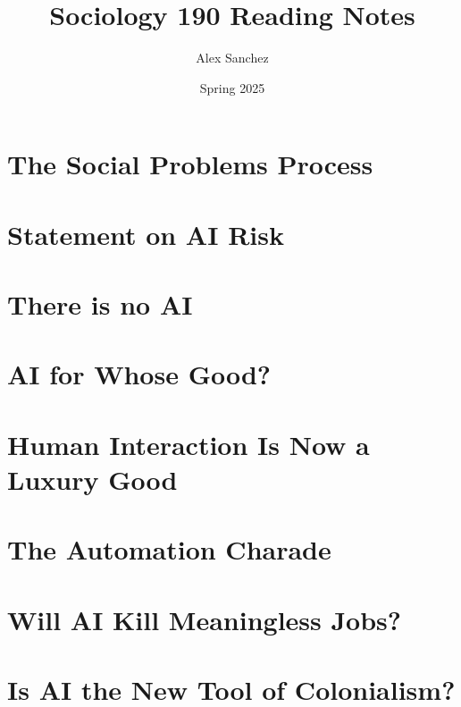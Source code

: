 \documentclass[openany]{book}
\title{Sociology 190 Reading Notes}
\author{Alex Sanchez}
\date{Spring 2025}
\begin{document}
\maketitle

\chapter{The Social Problems Process}

\chapter{Statement on AI Risk}

\chapter{There is no AI}

\chapter{AI for Whose Good?}


\chapter{Human Interaction Is Now a Luxury Good}


\chapter{The Automation Charade}


\chapter{}

\chapter{Will AI Kill Meaningless Jobs?}



\chapter{Is AI the New Tool of Colonialism?}

\end{document}
